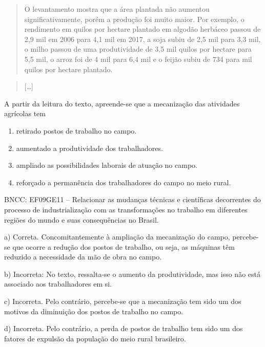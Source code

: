\begin{quote}
O levantamento mostra que a área plantada não aumentou
significativamente, porém a produção foi muito maior. Por exemplo, o
rendimento em quilos por hectare plantado em algodão herbáceo passou de
2,9 mil em 2006 para 4,1 mil em 2017, a soja subiu de 2,5 mil para 3,3
mil, o milho passou de uma produtividade de 3,5 mil quilos por hectare
para 5,5 mil, o arroz foi de 4 mil para 6,4 mil e o feijão subiu de 734
para mil quilos por hectare plantado.
\end{quote}

\begin{quote}
{[}\ldots{}{]}
\end{quote}


A partir da leitura do texto, apreende-se que a mecanização das
atividades agrícolas tem

\begin{enumerate}
\def\labelenumi{\alph{enumi})}
\item
  retirado postos de trabalho no campo.
\item
  aumentado a produtividade dos trabalhadores.
\item
  ampliado as possibilidades laborais de atuação no campo.
\item
  reforçado a permanência dos trabalhadores do campo no meio rural.
\end{enumerate}

BNCC: EF09GE11 -- Relacionar as mudanças técnicas e científicas
decorrentes do processo de industrialização com as transformações no
trabalho em diferentes regiões do mundo e suas consequências no Brasil.

a) Correta. Concomitantemente à ampliação da mecanização do campo,
percebe-se que ocorre a redução dos postos de trabalho, ou seja, as
máquinas têm reduzido a necessidade da mão de obra no campo.

b) Incorreta: No texto, ressalta-se o aumento da produtividade, mas isso
não está associado aos trabalhadores em si.

c) Incorreta. Pelo contrário, percebe-se que a mecanização tem sido um
dos motivos da diminuição dos postos de trabalho no campo.

d) Incorreta. Pelo contrário, a perda de postos de trabalho tem sido um
dos fatores de expulsão da população do meio rural brasileiro.


